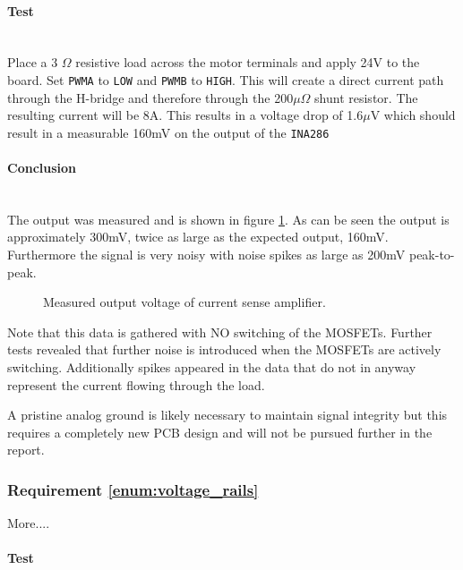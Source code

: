 \paragraph{Test}~\\
Place a 3 $\Omega$ resistive load across the motor terminals and apply 24V to the board.
Set \texttt{PWMA} to \texttt{LOW} and \texttt{PWMB} to \texttt{HIGH}.
This will create a direct current path through the H-bridge and therefore through the 200$\mu\Omega$ shunt resistor.
The resulting current will be 8A.
This results in a voltage drop of 1.6$\mu$V which should result in a measurable 160mV on the output of the \texttt{INA286}

\paragraph{Conclusion}~\\
The output was measured and is shown in figure \ref{fig:controllerboardv2_current_sense}.
As can be seen the output is approximately 300mV, twice as large as the expected output, 160mV.
Furthermore the signal is very noisy with noise spikes as large as 200mV peak-to-peak. 

\begin{figure}[h]
\centering

\caption{Measured output voltage of current sense amplifier.}
\label{fig:controllerboardv2_current_sense}
\end{figure}

Note that this data is gathered with NO switching of the MOSFETs.
Further tests revealed that further noise is introduced when the MOSFETs are actively switching.
Additionally spikes appeared in the data that do not in anyway represent the current flowing through the load.

A pristine analog ground is likely necessary to maintain signal integrity but this requires a completely new PCB design and will not be pursued further in the report. 

\subsubsection{Requirement \ref{enum:voltage_rails}} %
\label{ssub:requirement_enum:voltage_rails}
More....

\paragraph{Test}~\\

